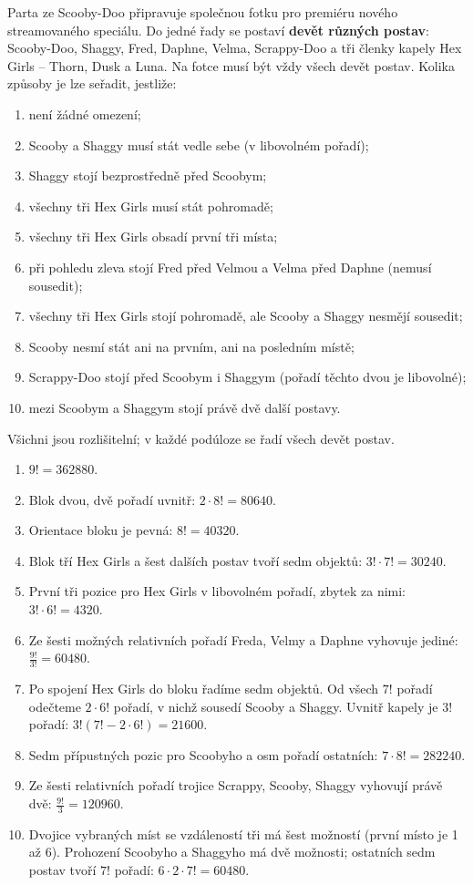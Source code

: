 \documentclass[11pt,a4paper]{article}
\begin{document}
\begin{prikladReseniBox}[title={Příklad 3}]
Parta ze Scooby-Doo připravuje společnou fotku pro premiéru nového streamovaného speciálu. Do jedné řady se postaví \textbf{devět různých postav}: Scooby-Doo, Shaggy, Fred, Daphne, Velma, Scrappy-Doo a tři členky kapely Hex Girls -- Thorn, Dusk a Luna. Na fotce musí být vždy všech devět postav. Kolika způsoby je lze seřadit, jestliže:
\begin{enumerate}[label=\alph*),leftmargin=*,itemsep=1pt]
\item není žádné omezení;
\item Scooby a Shaggy musí stát vedle sebe (v libovolném pořadí);
\item Shaggy stojí bezprostředně před Scoobym;
\item všechny tři Hex Girls musí stát pohromadě;
\item všechny tři Hex Girls obsadí první tři místa;
\item při pohledu zleva stojí Fred před Velmou a Velma před Daphne (nemusí sousedit);
\item všechny tři Hex Girls stojí pohromadě, ale Scooby a Shaggy nesmějí sousedit;
\item Scooby nesmí stát ani na prvním, ani na posledním místě;
\item Scrappy-Doo stojí před Scoobym i Shaggym (pořadí těchto dvou je libovolné);
\item mezi Scoobym a Shaggym stojí právě dvě další postavy.
\end{enumerate}
\tcblower
Všichni jsou rozlišitelní; v každé podúloze se řadí všech devět postav.
\begin{enumerate}[label=\alph*),leftmargin=*,itemsep=1pt]
\item $9!=362880$.
\item Blok dvou, dvě pořadí uvnitř: $2\cdot8!=80640$.
\item Orientace bloku je pevná: $8!=40320$.
\item Blok tří Hex Girls a šest dalších postav tvoří sedm objektů: $3!\cdot7!=30240$.
\item První tři pozice pro Hex Girls v libovolném pořadí, zbytek za nimi: $3!\cdot6!=4320$.
\item Ze šesti možných relativních pořadí Freda, Velmy a Daphne vyhovuje jediné: $\frac{9!}{3!}=60480$.
\item Po spojení Hex Girls do bloku řadíme sedm objektů. Od všech $7!$ pořadí odečteme $2\cdot6!$ pořadí, v nichž sousedí Scooby a Shaggy. Uvnitř kapely je $3!$ pořadí: $3!(7!-2\cdot6!)=21600$.
\item Sedm přípustných pozic pro Scoobyho a osm pořadí ostatních: $7\cdot8!=282240$.
\item Ze šesti relativních pořadí trojice Scrappy, Scooby, Shaggy vyhovují právě dvě: $\frac{9!}{3}=120960$.
\item Dvojice vybraných míst se vzdáleností tři má šest možností (první místo je 1 až 6). Prohození Scoobyho a Shaggyho má dvě možnosti; ostatních sedm postav tvoří $7!$ pořadí: $6\cdot2\cdot7!=60480$.
\end{enumerate}
\end{prikladReseniBox}
\end{document}
